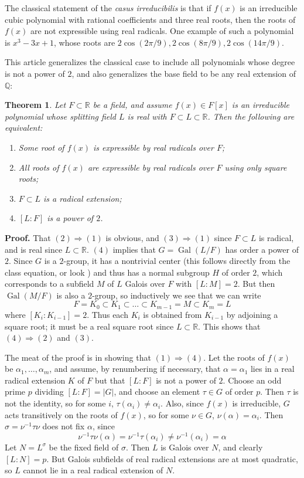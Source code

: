 \documentclass[12pt]{article}
\DeclareMathOperator{\Gal}{Gal}
\newtheorem{thm}{Theorem}
\newcommand{\Reals}{\mathbb{R}}
\newcommand{\Rats}{\mathbb{Q}}
\begin{document}
The classical statement of the \emph{casus irreducibilis} is that if $f(x)$ is an irreducible cubic polynomial with rational coefficients and three real roots, then the roots of $f(x)$ are not expressible using real radicals. One example of such a polynomial is $x^3-3x+1$, whose roots are $2\cos(2\pi/9), 2\cos(8\pi/9), 2\cos(14\pi/9)$.

This article generalizes the classical case to include all polynomials whose degree is not a power of $2$, and also generalizes the base field to be any real extension of $\Rats$:

\begin{thm} Let $F\subset \Reals$ be a field, and assume $f(x)\in F[x]$ is an irreducible polynomial whose splitting field $L$ is real with $F\subset L\subset \Reals$. Then the following are equivalent:
\begin{enumerate}
\item Some root of $f(x)$ is expressible by real radicals over $F$;
\item All roots of $f(x)$ are expressible by real radicals over $F$ using only square roots;
\item $F\subset L$ is a radical extension;
\item $[L:F]$ is  a power of $2$.
\end{enumerate}
\end{thm}
\textbf{Proof. } That $(2)\Rightarrow (1)$ is obvious, and $(3)\Rightarrow (1)$ since $F\subset L$ is radical, and is real since $L\subset \Reals$. $(4)$ implies that $G=\Gal(L/F)$ has order a power of $2$. Since $G$ is a $2$-group, it has a nontrivial center (this follows directly from the class equation, or look ) and thus has a normal subgroup $H$ of order $2$, which corresponds to a subfield $M$ of $L$ Galois over $F$ with $[L:M]=2$. But then $\Gal(M/F)$ is also a $2$-group, so inductively we see that we can write
\[F=K_0\subset K_1\subset \ldots \subset K_{m-1}=M \subset K_m=L\]
where $[K_i:K_{i-1}]=2$. Thus each $K_i$ is obtained from $K_{i-1}$ by adjoining a square root; it must be a real square root since $L\subset \Reals$. This shows that $(4)\Rightarrow (2)$ and $(3)$.

The meat of the proof is in showing that $(1)\Rightarrow (4)$. Let the roots of $f(x)$ be $\alpha_1,\ldots,\alpha_m$, and assume, by renumbering if necessary, that $\alpha=\alpha_1$ lies in a real radical extension $K$ of $F$ but that $[L:F]$ is not a power of $2$. Choose an odd prime $p$ dividing $[L:F]=\lvert G\rvert$, and choose an element $\tau\in G$ of order $p$. Then $\tau$ is not the identity, so for some $i$, $\tau(\alpha_i)\neq \alpha_i$. Also, since $f(x)$ is irreducible, $G$ acts transitively on the roots of $f(x)$, so for some $\nu\in G$, $\nu(\alpha)=\alpha_i$. Then $\sigma=\nu^{-1}\tau\nu$ does not fix $\alpha$, since
\[\nu^{-1}\tau\nu(\alpha)=\nu^{-1}\tau(\alpha_i)\neq \nu^{-1}(\alpha_i)=\alpha\]
Let $N=L^{\sigma}$ be the fixed field of $\sigma$. Then $L$ is Galois over $N$, and clearly $[L:N]=p$. But Galois subfields of real radical extensions are at most quadratic, so $L$ cannot lie in a real radical extension of $N$.
\end{document}
